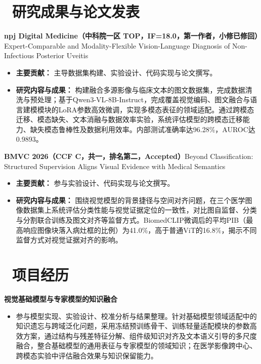 \documentclass[11pt]{article}
\newlength{\interProjectSpacing}
\newcommand{\projectsep}{\vspace{\interProjectSpacing}}
\begin{document}
\section{\makebox[\widthof{\faUsers}][c]{\color{CVBlue}\faUsers}\ 研究成果与论文发表}
\textbf{npj Digital Medicine（中科院一区 TOP，IF=18.0，第一作者，小修已修回）}\quad Expert-Comparable and Modality-Flexible Vision-Language Diagnosis of Non-Infectious Posterior Uveitis
\begin{itemize}[nosep]
\item \textbf{主要贡献：} 主导数据集构建、实验设计、代码实现与论文撰写。
\item \textbf{研究内容与成果：} 构建融合多源影像与临床文本的图文数据集，完成数据清洗与预处理；基于Qwen3-VL-8B-Instruct，完成覆盖视觉编码、图文融合与语言建模模块的LoRA参数高效微调，实现多模态表征的领域适配。通过跨模态迁移、模态缺失、文本消融与数据效率实验，系统评估模型的跨模态迁移能力、缺失模态鲁棒性及数据利用效率。内部测试准确率达96.28\%，AUROC达0.9893。
\end{itemize}
\projectsep
\textbf{BMVC 2026（CCF C，共一，排名第二，Accepted）}\quad Beyond Classification: Structured Supervision Aligns Visual Evidence with Medical Semantics
\begin{itemize}[nosep]
\item \textbf{主要贡献：} 参与实验设计、代码实现与论文撰写。
\item \textbf{研究内容与成果：} 围绕视觉模型的背景捷径与空间对齐问题，在三个医学图像数据集上系统评估分类性能与视觉证据定位的一致性，对比图自监督、分类与分割联合训练及图文对齐等监督方式。BiomedCLIP微调后的平均PIB（最高响应图像块落入病灶框的比例）为41.0\%，高于普通ViT的16.8\%，揭示不同监督方式对视觉证据对齐的影响。
\end{itemize}

\section{\makebox[\widthof{\faBriefcase}][c]{\color{CVBlue}\faBriefcase}\ 项目经历}
\textbf{视觉基础模型与专家模型的知识融合}
\begin{itemize}[nosep]
\item 参与模型实现、实验设计、校准分析与结果整理。针对基础模型领域适配中的知识遗忘与跨域泛化问题，采用冻结预训练骨干、训练轻量适配模块的参数高效方案，通过结构与残差特征分解、组件级知识对齐及文本语义引导的多尺度融合，整合基础模型的通用表征与专家模型的领域知识；在医学影像跨中心、跨模态实验中评估融合效果与知识保留能力。
\end{itemize}
\end{document}
